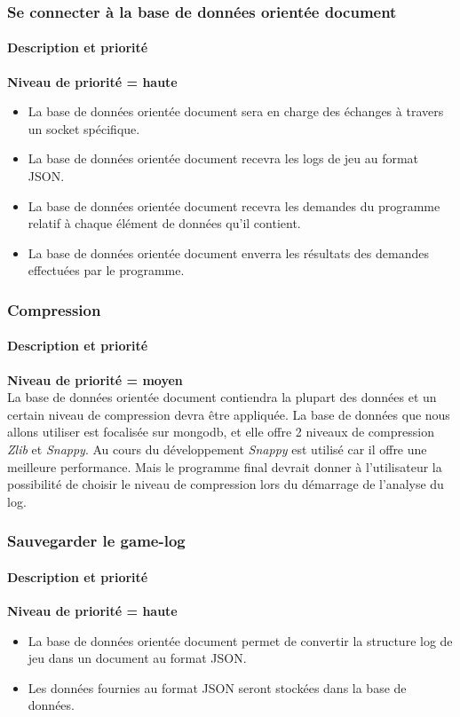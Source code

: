 \subsubsection{Se connecter à la base de données orientée document }
\paragraph*{Description et priorité}
\textbf{Niveau de priorité = haute}\\
\begin{itemize}
\item La base de données orientée document sera en charge des échanges à travers un socket spécifique.
\item La base de données orientée document recevra les logs de jeu au format JSON.
\item La base de données orientée document recevra les demandes du programme relatif à chaque élément de données qu'il contient.
\item La base de données orientée document enverra les résultats des demandes effectuées par le programme.
\end{itemize}


\subsubsection{Compression}
\paragraph*{Description et priorité}
\textbf{Niveau de priorité = moyen}\\

La base de données orientée document contiendra la plupart des données et un certain niveau de compression devra être appliquée.
La base de données que nous allons utiliser est focalisée sur mongodb, et elle offre 2 niveaux de compression \textit{Zlib} et \textit{Snappy}.
Au cours du développement \textit{Snappy} est utilisé car il offre une meilleure performance.
Mais le programme final devrait donner à l'utilisateur la possibilité de choisir le niveau de compression lors du démarrage de l'analyse du log.

\subsubsection{Sauvegarder le game-log}

\paragraph*{Description et priorité}
\textbf{Niveau de priorité = haute}\\
\begin{itemize}
\item La base de données orientée document permet de convertir la structure log de jeu dans un document au format JSON.
\item Les données fournies au format JSON seront stockées dans la base de données.
\end{itemize}
